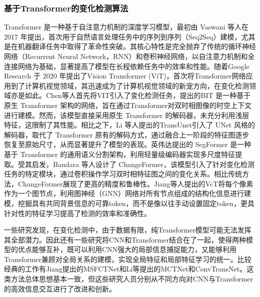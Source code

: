 \documentclass[lang=chs, degree=master, blindreview=false, adobe=false]{yanputhesis}
\begin{document}
\subsubsection{基于Transformer的变化检测算法}
Transformer 是一种基于自注意力机制的深度学习模型，最初由 Vaswani 等人在 2017 年提出\cite{vaswani2017transformer}，首次用于自然语言处理任务中的序列到序列（Seq2Seq）建模，尤其是在机器翻译任务中取得了革命性突破。其核心特性是完全抛弃了传统的循环神经网络\cite{zaremba2014rnn}（Recurrent Neural Network，RNN）和卷积神经网络，以自注意力机制和全连接网络为基础，显著提高了模型在长程依赖任务中的效率和性能。随着Google Research 于 2020 年提出了Vision Transformer (ViT)\cite{dosovitskiy2020vit}，首次将Transformer网络应用到了计算机视觉领域，其迅速成为了计算机视觉领域的新宠方向，在变化检测领域亦是如此。Chen等人首先将VIT引入了变化检测任务，提出的BIT\cite{chen2021BIT} 是一种基于原生 Transformer 架构的网络，旨在通过Transformer对双时相图像的时空上下文进行建模。然而，该模型直接采用原生 Transformer 的解码器，未充分利用浅层特征，这限制了其性能。相比之下，Li 等人提出的TransUnet\cite{li2022transunetcd}引入了 UNet 风格的解码器，取代了 Transformer 原有的解码方式，通过融合上一阶段的特征图逐步恢复至原始尺寸，从而显著提升了模型的表现。英伟达提出的 SegFormer \cite{xie2021segformer}是一种基于 Transformer 的通用语义分割架构，利用轻量级编码器实现多尺度特征提取。受其启发，Bandara 等人设计了 ChangeFormer\cite{bandara2022transformer}，该模型引入了针对变化检测任务的特定模块，通过卷积操作学习双时相特征图之间的变化关系。相比传统方法，ChangeFormer展现了更高的精度和鲁棒性。Jiang等人提出的VcT\cite{jiang2023vct}将每个像素作为一个图节点，利用图神经（GNN）网络对所有节点组成的结构化信息进行建模，挖掘具有共同背景信息的可靠token，而不是像以往手动设置固定token，更具针对性的特征学习提高了检测的效率和准确性。

一些研究发现，在变化检测中，由于数据有限，纯Transformer模型可能无法发挥其全部潜力。因此还有一些研究将CNN和Transformer结合在了一起，使得两种模型的优点能够互补，既可以利用CNN强大的局部信息捕捉能力，又能够利用Transformer兼顾对全局关系的建模，实现全局特征和局部特征学习的统一。比较经典的工作有Jiang提出的MSFCTNet\cite{jiang2024cnntranscd}和Li等提出的MCTNet\cite{lwm2023cnntransCD2}和ConvTransNet\cite{lwm2023cnntransCD}。这类方法总体思想基本一致，但这些研究人员分别从不同方向对CNN与Transformer的高效信息交互进行了改进和创新。
\end{document}
